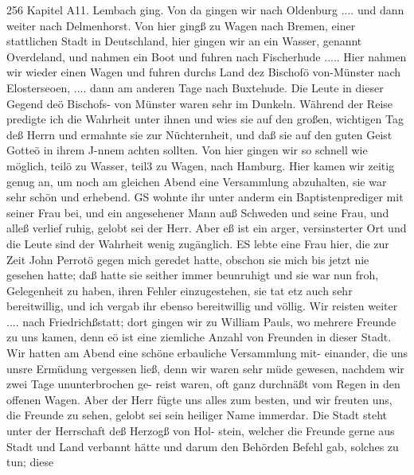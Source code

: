 256 Kapitel A11.
Lembach ging. Von da gingen wir nach Oldenburg .... und
dann weiter nach Delmenhorst. Von hier gingß zu Wagen nach
Bremen, einer stattlichen Stadt in Deutschland, hier gingen wir
an ein Wasser, genannt Overdeland, und nahmen ein Boot und
fuhren nach Fischerhude ..... Hier nahmen wir wieder einen
Wagen und fuhren durchs Land dez Bischofö von-Münster nach
Elosterseoen, .... dann am anderen Tage nach Buxtehude.
Die Leute in dieser Gegend deö Bischofs- von Münster waren
sehr im Dunkeln. Während der Reise predigte ich die Wahrheit
unter ihnen und wies sie auf den großen, wichtigen Tag deß
Herrn und ermahnte sie zur Nüchternheit, und daß sie auf den
guten Geist Gotteö in ihrem J-nnem achten sollten.
Von hier gingen wir so schnell wie möglich, teilö zu Wasser,
teil3 zu Wagen, nach Hamburg. Hier kamen wir zeitig genug an,
um noch am gleichen Abend eine Versammlung abzuhalten, sie
war sehr schön und erhebend. GS wohnte ihr unter anderm ein
Baptistenprediger mit seiner Frau bei, und ein angesehener Mann
auß Schweden und seine Frau, und alleß verlief ruhig, gelobt sei
der Herr. Aber eß ist ein arger, versinsterter Ort und die Leute
sind der Wahrheit wenig zugänglich.
ES lebte eine Frau hier, die zur Zeit John Perrotö gegen
mich geredet hatte, obschon sie mich bis jetzt nie gesehen hatte;
daß hatte sie seither immer beunruhigt und sie war nun froh,
Gelegenheit zu haben, ihren Fehler einzugestehen, sie tat etz auch
sehr bereitwillig, und ich vergab ihr ebenso bereitwillig und
völlig.
Wir reisten weiter .... nach Friedrichßstatt; dort gingen
wir zu William Pauls, wo mehrere Freunde zu uns kamen,
denn eö ist eine ziemliche Anzahl von Freunden in dieser Stadt.
Wir hatten am Abend eine schöne erbauliche Versammlung mit-
einander, die uns unsre Ermüdung vergessen ließ, denn wir waren
sehr müde gewesen, nachdem wir zwei Tage ununterbrochen ge-
reist waren, oft ganz durchnäßt vom Regen in den offenen
Wagen. Aber der Herr fügte uns alles zum besten, und wir
freuten uns, die Freunde zu sehen, gelobt sei sein heiliger Name
immerdar.
Die Stadt steht unter der Herrschaft deß Herzogß von Hol-
stein, welcher die Freunde gerne aus Stadt und Land verbannt
hätte und darum den Behörden Befehl gab, solches zu tun; diese


